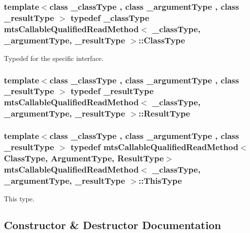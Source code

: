 \subsubsection[{Class\+Type}]{\setlength{\rightskip}{0pt plus 5cm}template$<$class \+\_\+class\+Type , class \+\_\+argument\+Type , class \+\_\+result\+Type $>$ typedef \+\_\+class\+Type {\bf mts\+Callable\+Qualified\+Read\+Method}$<$ \+\_\+class\+Type, \+\_\+argument\+Type, \+\_\+result\+Type $>$\+::{\bf Class\+Type}}\label{classmts_callable_qualified_read_method_a6cfee5c3c3c49c691c2f5176ea79d735}
Typedef for the specific interface. \hypertarget{classmts_callable_qualified_read_method_a728e57693d845188e5c248a6437f843e}{}
\subsubsection[{Result\+Type}]{\setlength{\rightskip}{0pt plus 5cm}template$<$class \+\_\+class\+Type , class \+\_\+argument\+Type , class \+\_\+result\+Type $>$ typedef \+\_\+result\+Type {\bf mts\+Callable\+Qualified\+Read\+Method}$<$ \+\_\+class\+Type, \+\_\+argument\+Type, \+\_\+result\+Type $>$\+::{\bf Result\+Type}}\label{classmts_callable_qualified_read_method_a728e57693d845188e5c248a6437f843e}
\hypertarget{classmts_callable_qualified_read_method_a4eae6a460f791fe12b4dcf83d83d429e}{}
\subsubsection[{This\+Type}]{\setlength{\rightskip}{0pt plus 5cm}template$<$class \+\_\+class\+Type , class \+\_\+argument\+Type , class \+\_\+result\+Type $>$ typedef {\bf mts\+Callable\+Qualified\+Read\+Method}$<${\bf Class\+Type}, {\bf Argument\+Type}, {\bf Result\+Type}$>$ {\bf mts\+Callable\+Qualified\+Read\+Method}$<$ \+\_\+class\+Type, \+\_\+argument\+Type, \+\_\+result\+Type $>$\+::{\bf This\+Type}}\label{classmts_callable_qualified_read_method_a4eae6a460f791fe12b4dcf83d83d429e}
This type. 

\subsection{Constructor \& Destructor Documentation}
\hypertarget{classmts_callable_qualified_read_method_a098279bdc51bf3652822ab8e21061fb0}{}
